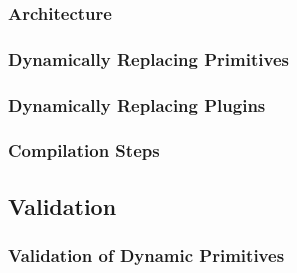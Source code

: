 \subsubsection*{Architecture}

\subsubsection*{Dynamically Replacing Primitives}

\subsubsection*{Dynamically Replacing Plugins}

\subsubsection*{Compilation Steps}

\subsection{Validation}


\subsubsection*{Validation of Dynamic Primitives}

